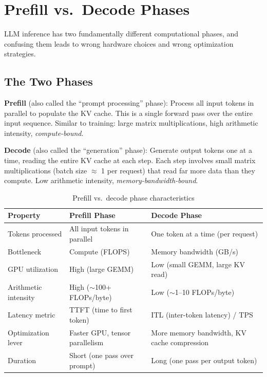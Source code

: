 \section{Prefill vs.\ Decode Phases}
\label{sec:prefill_decode}

LLM inference has two fundamentally different computational phases, and confusing them leads to wrong hardware choices and wrong optimization strategies.

\subsection{The Two Phases}

\textbf{Prefill} (also called the ``prompt processing'' phase): Process all input tokens in parallel to populate the KV cache. This is a single forward pass over the entire input sequence. Similar to training: large matrix multiplications, high arithmetic intensity, \textit{compute-bound}.

\textbf{Decode} (also called the ``generation'' phase): Generate output tokens one at a time, reading the entire KV cache at each step. Each step involves small matrix multiplications (batch size $\approx$ 1 per request) that read far more data than they compute. Low arithmetic intensity, \textit{memory-bandwidth-bound}.

\begin{table}[H]
\centering
\caption{Prefill vs.\ decode phase characteristics}
\begin{tabularx}{\textwidth}{lXX}
\toprule
\textbf{Property} & \textbf{Prefill Phase} & \textbf{Decode Phase} \\
\midrule
Tokens processed & All input tokens in parallel & One token at a time (per request) \\
Bottleneck & Compute (FLOPS) & Memory bandwidth (GB/s) \\
GPU utilization & High (large GEMM) & Low (small GEMM, large KV read) \\
Arithmetic intensity & High ($\sim$100+ FLOPs/byte) & Low ($\sim$1--10 FLOPs/byte) \\
Latency metric & TTFT (time to first token) & ITL (inter-token latency) / TPS \\
Optimization lever & Faster GPU, tensor parallelism & More memory bandwidth, KV cache compression \\
Duration & Short (one pass over prompt) & Long (one pass per output token) \\
\bottomrule
\end{tabularx}
\end{table}

